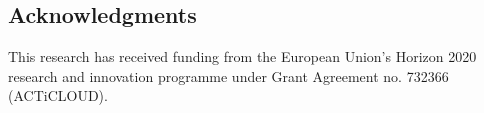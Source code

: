 \documentclass{cidr-2019}
\begin{document}


\subsection*{Acknowledgments} This research has received funding from the European Union's Horizon 2020 research and innovation programme under Grant Agreement no. 732366 (ACTiCLOUD).

{\small  
 }
\end{document}
